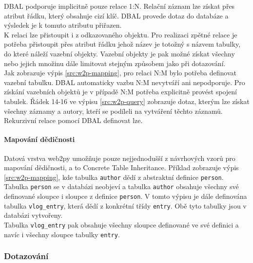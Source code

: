 \documentclass[ing,male,java,dept456]{diploma}						%
\begin{document}
DBAL podporuje implicitně pouze relace 1:N. Relační záznam lze získat přes atribut řádku, který obsahuje cizí klíč. DBAL provede dotaz do databáze a výsledek je k tomuto atributu přiřazen. \\
K relaci lze přistoupit i z odkazovaného objektu. Pro realizaci zpětné relace je potřeba přistoupit přes atribut řádku jehož název je totožný s názvem tabulky, do které náleží vazební objekty. Vazební objekty je pak možné získat všechny nebo jejich množinu dále limitovat stejným způsobem jako při dotazování. \\
Jak zobrazuje výpis \ref{src:w2p-mapping}, pro relaci N:M bylo potřeba definovat vazební tabulku. DBAL automaticky vazbu N:M nevytváří ani nepodporuje. Pro získání vazebních objektů je v případě N:M potřeba explicitně provést spojení tabulek. Řádek 14-16 ve výpisu \ref{src:w2p-query} zobrazuje dotaz, kterým lze získat všechny záznamy a autory, kteří se podíleli na vytváření těchto záznamů. \\
Rekurzivní relace pomocí DBAL definovat lze. \\

\paragraph{Mapování dědičnosti}
Datová vrstva web2py umožňuje pouze nejjednodušší z návrhových vzorů pro mapování dědičnosti, a to Concrete Table Inheritance. Příklad zobrazuje výpis \ref{src:w2p-mapping}, kde tabulka \lstinline[style=inlinepython]|author| dědí z abstraktní definice \lstinline[style=inlinepython]|person|. Tabulka \lstinline[style=inlinepython]|person| se v databázi neobjeví a tabulka \lstinline[style=inlinepython]|author| obsahuje všechny své definované sloupce i sloupce z definice \lstinline[style=inlinepython]|person|. V tomto výpisu je dále definována tabulka \lstinline[style=inlinepython]|vlog_entry|, která dědí z konkrétní třídy \lstinline[style=inlinepython]|entry|. Obě tyto tabulky jsou v databázi vytvořeny. \\
Tabulka \lstinline[style=inlinepython]|vlog_entry| pak obsahuje všechny sloupce definované ve své definici a navíc i všechny sloupce tabulky \lstinline[style=inlinepython]|entry|.

\subsubsection{Dotazování}
\end{document}
